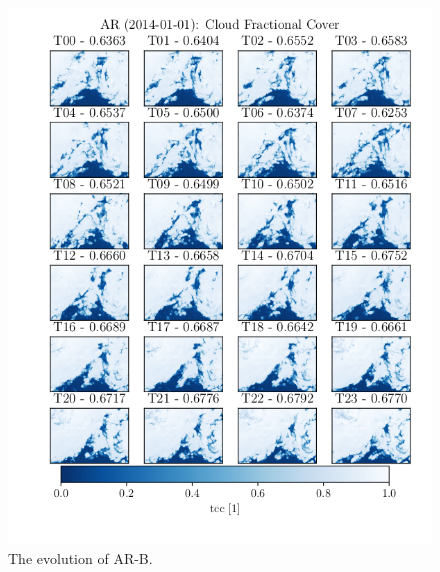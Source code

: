 \begin{figure}
    \centering
    \includegraphics{python_figs/AR_timelapse_cloud_cover_24hrs_from_2014_01_01_base_on_one_hrERA5.png}
    \caption{The evolution of AR-B.}
    \label{fig:AR-B-sequenc-ERA5}
\end{figure}

